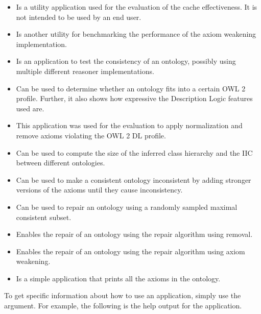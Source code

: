 \begin{itemize}
    \item {} \enspace Is a utility application used for the evaluation of the cache effectiveness. It is not intended to be used by an end user.
    \item {} \enspace Is another utility for benchmarking the performance of the axiom weakening implementation.
    \item {} \enspace Is an application to test the consistency of an ontology, possibly using multiple different reasoner implementations.
    \item {} \enspace Can be used to determine whether an ontology fits into a certain OWL 2 profile. Further, it also shows how expressive the Description Logic features used are.
    \item {} \enspace This application was used for the evaluation to apply normalization and remove axioms violating the OWL 2 DL profile.
    \item {} \enspace Can be used to compute the size of the inferred class hierarchy and the IIC between different ontologies.
    \item {} \enspace Can be used to make a consistent ontology inconsistent by adding stronger versions of the axioms until they cause inconsistency.
    \item {} \enspace Can be used to repair an ontology using a randomly sampled maximal consistent subset.
    \item {} \enspace Enables the repair of an ontology using the repair algorithm using removal.
    \item {} \enspace Enables the repair of an ontology using the repair algorithm using axiom weakening.
    \item {} \enspace Is a simple application that prints all the axioms in the ontology.
\end{itemize}

To get specific information about how to use an application, simply use the  argument. For example, the following is the help output for the  application.

